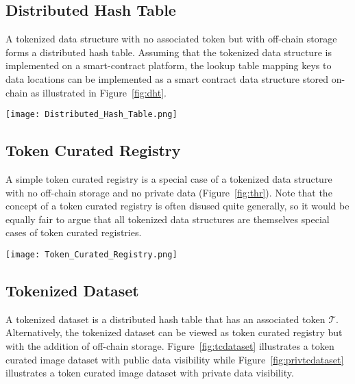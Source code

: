 \documentclass{llncs}
\begin{document}
\subsection{Distributed Hash Table}

A tokenized data structure with no associated token but with off-chain storage forms a distributed hash table. Assuming that the tokenized data structure is implemented on a smart-contract platform, the lookup table mapping keys to data locations can be implemented as a smart contract data structure stored on-chain as illustrated in Figure~\ref{fig:dht}.

\begin{figure*}
  \centering
  \texttt{[image: Distributed\_Hash\_Table.png]}
  \caption{A distributed hash table is a tokenized data structure (with no associated token).}
  \label{fig:dht}
\end{figure*}

\subsection{Token Curated Registry}

A simple token curated registry is a special case of a tokenized data structure with no off-chain storage and no private data (Figure~\ref{fig:thr}). Note that the concept of a token curated registry is often disused quite generally, so it would be equally fair to argue that all tokenized data structures are themselves special cases of token curated registries.

\begin{figure*}
  \centering
  \texttt{[image: Token\_Curated\_Registry.png]}
  \caption{A simple token curated registry is a special case of a tokenized data structure with on-chain storage and public visibility.}
  \label{fig:thr}
\end{figure*}


\subsection{Tokenized Dataset}

A tokenized dataset is a distributed hash table that has an associated token $\mathcal{T}$. Alternatively, the tokenized dataset can be viewed as token curated registry but with the addition of off-chain storage. Figure~\ref{fig:tcdataset} illustrates a token curated image dataset with public data visibility while Figure~\ref{fig:privtcdataset} illustrates a token curated image dataset with private data visibility.
\end{document}
